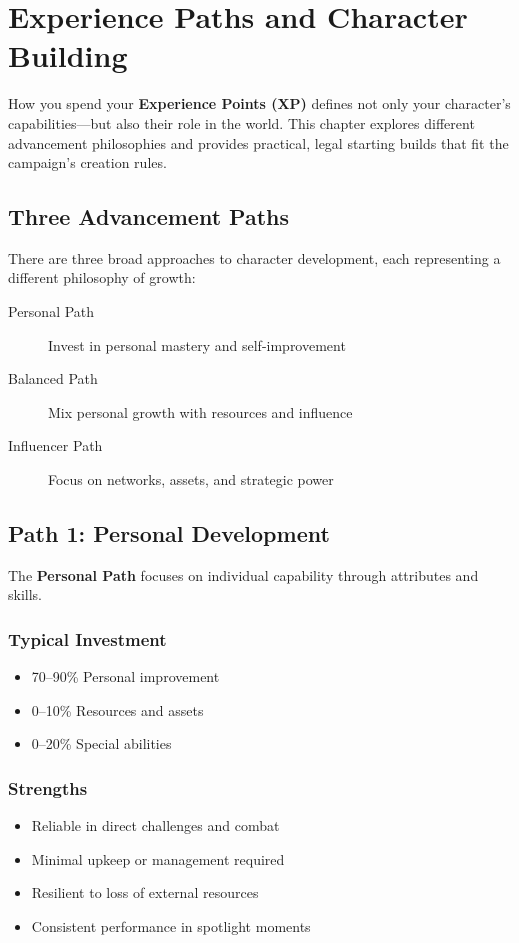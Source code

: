 \chapter{Experience Paths and Character Building}
\label{ch:xp-paths}

How you spend your \textbf{Experience Points (XP)} defines not only your character's capabilities—but also their role in the world. This chapter explores different advancement philosophies and provides practical, legal starting builds that fit the campaign's creation rules.

\section{Three Advancement Paths}

There are three broad approaches to character development, each representing a different philosophy of growth:

\begin{description}
\item[Personal Path] Invest in personal mastery and self-improvement
\item[Balanced Path] Mix personal growth with resources and influence
\item[Influencer Path] Focus on networks, assets, and strategic power
\end{description}

\section{Path 1: Personal Development}

The \textbf{Personal Path} focuses on individual capability through attributes and skills.

\subsection*{Typical Investment}
\begin{itemize}
\item 70--90\% Personal improvement
\item 0--10\% Resources and assets
\item 0--20\% Special abilities
\end{itemize}

\subsection*{Strengths}
\begin{itemize}
\item Reliable in direct challenges and combat
\item Minimal upkeep or management required
\item Resilient to loss of external resources
\item Consistent performance in spotlight moments
\end{itemize}


